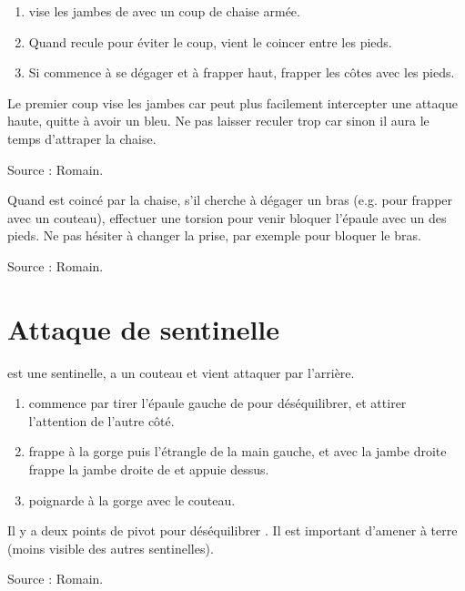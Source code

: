 \begin{technique}

\begin{enumerate}
	\item \A vise les jambes de \D avec un coup de chaise armée.
	
	\item Quand \D recule pour éviter le coup, \A vient le coincer entre les pieds.
	
	\item Si \D commence à se dégager et à frapper haut, frapper les côtes avec les pieds.
\end{enumerate}

Le premier coup vise les jambes car \D peut plus facilement intercepter une attaque haute, quitte à avoir un bleu.
Ne pas laisser \D reculer trop car sinon il aura le temps d'attraper la chaise.

Source : Romain.
\end{technique}


\begin{technique}
Quand \D est coincé par la chaise, s'il cherche à dégager un bras (e.g. pour frapper avec un couteau), effectuer une torsion pour venir bloquer l'épaule avec un des pieds.
Ne pas hésiter à changer la prise, par exemple pour bloquer le bras.

Source : Romain.
\end{technique}


\section{Attaque de sentinelle}

\D est une sentinelle, \A a un couteau et vient attaquer \D par l'arrière.


\begin{technique}

\begin{enumerate}
	\item \A commence par tirer l'épaule gauche de \D pour déséquilibrer, et attirer l'attention de l'autre côté.
	
	\item \A frappe \D à la gorge puis l'étrangle de la main gauche, et avec la jambe droite frappe la jambe droite de \D et appuie dessus.
	
	\item \A poignarde \D à la gorge avec le couteau.
\end{enumerate}

Il y a deux points de pivot pour déséquilibrer \D.
Il est important d'amener \D à terre (moins visible des autres sentinelles).

Source : Romain.
\end{technique}



